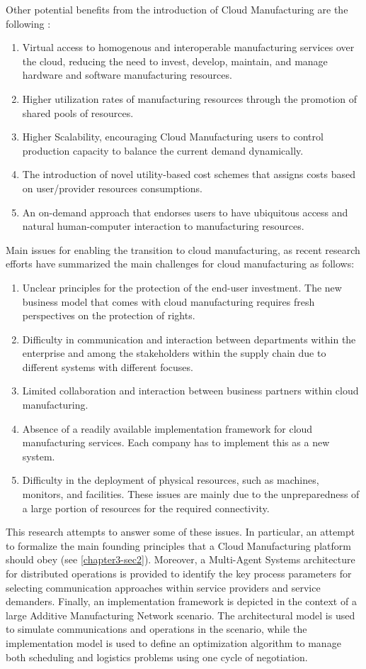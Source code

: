 Other potential benefits from the introduction of Cloud Manufacturing are the following \parencite{ren_cloud_2017}:
\begin{enumerate}
    \item Virtual access to homogenous and interoperable manufacturing services over the cloud, reducing the need to invest, develop, maintain, and manage hardware and software manufacturing resources.
    \item Higher utilization rates of manufacturing resources through the promotion of shared pools of resources.
    \item Higher Scalability, encouraging Cloud Manufacturing users to control production capacity to balance the current demand dynamically.
    \item The introduction of novel utility-based cost schemes that assigns costs based on user/provider resources consumptions.
    \item An on-demand approach that endorses users to have ubiquitous access and natural human-computer interaction to manufacturing resources.
\end{enumerate}
Main issues for enabling the transition to cloud manufacturing, as recent research efforts have summarized the main challenges for cloud manufacturing as follows:
\begin{enumerate}
    \item Unclear principles for the protection of the end-user investment. The new business model that comes with cloud manufacturing requires fresh perspectives on the protection of rights.
    \item Difficulty in communication and interaction between departments within the enterprise and among the stakeholders within the supply chain due to different systems with different focuses.
    \item Limited collaboration and interaction between business partners within cloud manufacturing.
    \item Absence of a readily available implementation framework for cloud manufacturing services. Each company has to implement this as a new system.
    \item Difficulty in the deployment of physical resources, such as machines, monitors, and facilities. These issues are mainly due to the unpreparedness of a large portion of resources for the required connectivity.
\end{enumerate}
This research attempts to answer some of these issues. In particular, an attempt to formalize the main founding principles that a Cloud Manufacturing platform should obey (see \autoref{chapter3-sec2}). Moreover, a Multi-Agent Systems architecture for distributed operations is provided to identify the key process parameters for selecting communication approaches within service providers and service demanders. Finally, an implementation framework is depicted in the context of a large Additive Manufacturing Network scenario. The architectural model is used to simulate communications and operations in the scenario, while the implementation model is used to define an optimization algorithm to manage both scheduling and logistics problems using one cycle of negotiation.
